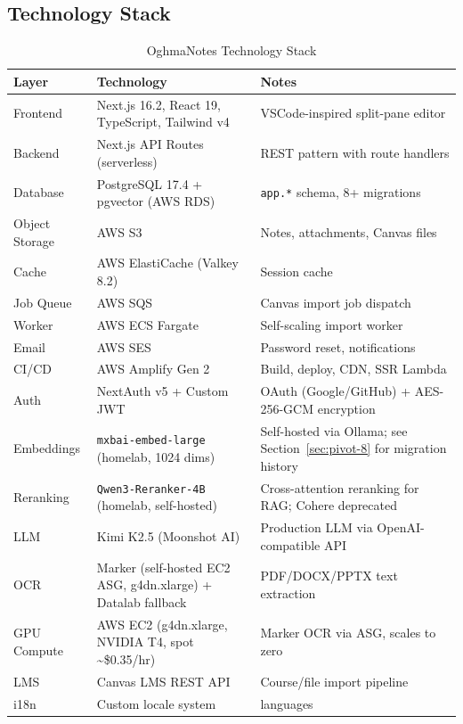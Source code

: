 \documentclass[12pt,a4paper]{article}
\newcommand{\tech}[1]{\texttt{#1}}
\begin{document}
\subsection{Technology Stack}

\begin{table}[H]
\centering
\small
\begin{tabularx}{\textwidth}{l>{\raggedright\arraybackslash}X>{\raggedright\arraybackslash}X}
\toprule
\textbf{Layer} & \textbf{Technology} & \textbf{Notes} \\
\midrule
Frontend        & Next.js 16.2, React 19, TypeScript, Tailwind v4 & VSCode-inspired split-pane editor \\
Backend         & Next.js API Routes (serverless)             & REST pattern with route handlers \\
Database        & PostgreSQL 17.4 + pgvector (AWS RDS)        & \tech{app.*} schema, 8+ migrations \\
Object Storage  & AWS S3                                      & Notes, attachments, Canvas files \\
Cache           & AWS ElastiCache (Valkey 8.2)                & Session cache \\
Job Queue       & AWS SQS                                     & Canvas import job dispatch \\
Worker          & AWS ECS Fargate                             & Self-scaling import worker \\
Email           & AWS SES                                     & Password reset, notifications \\
CI/CD           & AWS Amplify Gen 2                           & Build, deploy, CDN, SSR Lambda \\
Auth            & NextAuth v5 + Custom JWT                   & OAuth (Google/GitHub) + AES-256-GCM encryption \\
Embeddings      & \tech{mxbai-embed-large} (homelab, 1024 dims) & Self-hosted via Ollama; see Section~\ref{sec:pivot-8} for migration history \\
Reranking       & \tech{Qwen3-Reranker-4B} (homelab, self-hosted) & Cross-attention reranking for RAG; Cohere deprecated \\
LLM             & Kimi K2.5 (Moonshot AI)                    & Production LLM via OpenAI-compatible API \\
OCR             & Marker (self-hosted EC2 ASG, g4dn.xlarge) + Datalab fallback & PDF/DOCX/PPTX text extraction \\
GPU Compute     & AWS EC2 (g4dn.xlarge, NVIDIA T4, spot \textasciitilde\$0.35/hr) & Marker OCR via ASG, scales to zero \\
LMS             & Canvas LMS REST API                         & Course/file import pipeline \\
i18n            & Custom locale system                        & 12 languages \\
\bottomrule
\end{tabularx}
\caption{OghmaNotes Technology Stack}
\label{tab:tech-stack}
\end{table}
\end{document}
